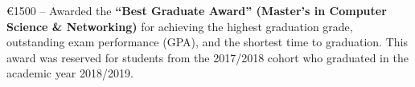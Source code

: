 





    \euro{}1500 – Awarded the \textbf{``Best Graduate Award'' (Master’s in Computer Science \& Networking)} for achieving the highest graduation grade, outstanding exam performance (GPA), and the shortest time to graduation. This award was reserved for students from the 2017/2018 cohort who graduated in the academic year 2018/2019.